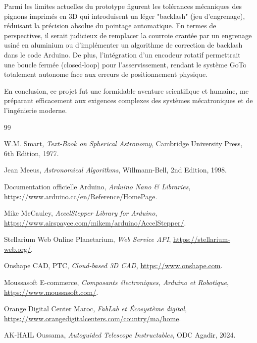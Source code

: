 \documentclass[12pt,a4paper]{report}
\begin{document}
\begin{enumerate}
\begin{enumerate}
Parmi les limites actuelles du prototype figurent les tolérances mécaniques des pignons imprimés en 3D qui introduisent un léger "backlash" (jeu d'engrenage), réduisant la précision absolue du pointage automatique. En termes de perspectives, il serait judicieux de remplacer la courroie crantée par un engrenage usiné en aluminium ou d'implémenter un algorithme de correction de backlash dans le code Arduino. De plus, l'intégration d'un encodeur rotatif permettrait une boucle fermée (closed-loop) pour l'asservissement, rendant le système GoTo totalement autonome face aux erreurs de positionnement physique.

En conclusion, ce projet fut une formidable aventure scientifique et humaine, me préparant efficacement aux exigences complexes des systèmes mécatroniques et de l'ingénierie moderne.

\clearpage

\begin{thebibliography}{99}

W.M. Smart, \textit{Text-Book on Spherical Astronomy}, Cambridge University Press, 6th Edition, 1977.

Jean Meeus, \textit{Astronomical Algorithms}, Willmann-Bell, 2nd Edition, 1998.

Documentation officielle Arduino, \textit{Arduino Nano \& Libraries}, \url{https://www.arduino.cc/en/Reference/HomePage}.

Mike McCauley, \textit{AccelStepper Library for Arduino}, \url{https://www.airspayce.com/mikem/arduino/AccelStepper/}.

Stellarium Web Online Planetarium, \textit{Web Service API}, \url{https://stellarium-web.org/}.

Onshape CAD, PTC, \textit{Cloud-based 3D CAD}, \url{https://www.onshape.com}.

Moussasoft E-commerce, \textit{Composants électroniques, Arduino et Robotique}, \url{https://www.moussasoft.com/}.

Orange Digital Center Maroc, \textit{FabLab et Écosystème digital}, \url{https://www.orangedigitalcenters.com/country/ma/home}.

AK-HAIL Oussama, \textit{Autoguided Telescope Instructables}, ODC Agadir, 2024.


\end{thebibliography}
\end{enumerate}
\end{enumerate}
\end{document}
